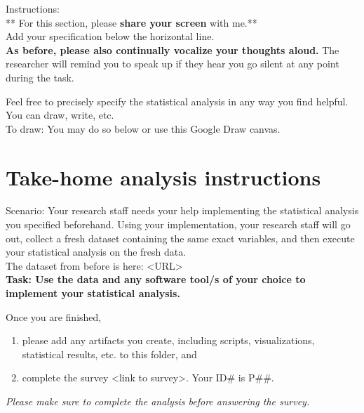 \hfill 

Instructions: \\
** For this section, please \textbf{share your screen} with me.** \\

Add your specification below the horizontal line. \\

\textbf{As before, please also continually vocalize your thoughts aloud.} The
researcher will remind you to speak up if they hear you go silent at any point
during the task. 

\hrulefill

Feel free to precisely specify the statistical analysis in any way you find
helpful. You can draw, write, etc. \\

To draw: You may do so below or use this Google Draw canvas.
\clearpage

\section{Take-home analysis instructions}
Scenario: Your research staff needs your help implementing the statistical
analysis you specified beforehand. Using your implementation, your research
staff will go out, collect a fresh dataset containing the same exact variables,
and then execute your statistical analysis on the fresh data. \\

The dataset from before is here: <URL>\\

\textbf{Task: Use the data and any software tool/s of your choice to implement your
statistical analysis.}

Once you are finished,
\begin{enumerate}
    \item please add any artifacts you create, including scripts, visualizations, statistical results, etc. to this folder, and 
    \item complete the survey <link to survey>. Your ID\# is P\#\#. 
\end{enumerate} 

\textit{Please make sure to complete the analysis before answering the survey.}

